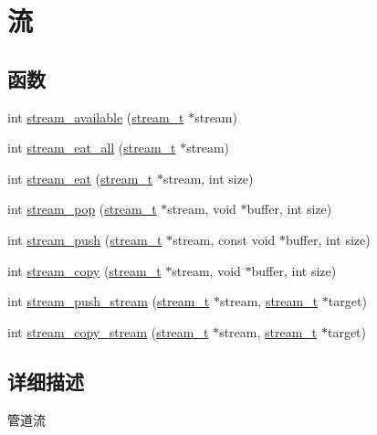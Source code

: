 \hypertarget{group__stream}{}\section{流}
\label{group__stream}
\subsection*{函数}
\begin{DoxyCompactItemize}
\item 
int \hyperlink{group__stream_ga6e109b2dc520782567dc1891af3b945e}{stream\+\_\+available} (\hyperlink{struct__stream__t}{stream\+\_\+t} $\ast$stream)
\item 
int \hyperlink{group__stream_gaef7f4ca2c201faf5d82a1dad4c8d7814}{stream\+\_\+eat\+\_\+all} (\hyperlink{struct__stream__t}{stream\+\_\+t} $\ast$stream)
\item 
int \hyperlink{group__stream_ga1ab922f8bab979099b3abc3ee54dc59d}{stream\+\_\+eat} (\hyperlink{struct__stream__t}{stream\+\_\+t} $\ast$stream, int size)
\item 
int \hyperlink{group__stream_ga6e01758abf49f8b08cd457f1cb48a954}{stream\+\_\+pop} (\hyperlink{struct__stream__t}{stream\+\_\+t} $\ast$stream, void $\ast$buffer, int size)
\item 
int \hyperlink{group__stream_gae7e63ef142733eb3aea7401e28bc9a75}{stream\+\_\+push} (\hyperlink{struct__stream__t}{stream\+\_\+t} $\ast$stream, const void $\ast$buffer, int size)
\item 
int \hyperlink{group__stream_ga380555bf71ee99f6b2bb4f76738d507f}{stream\+\_\+copy} (\hyperlink{struct__stream__t}{stream\+\_\+t} $\ast$stream, void $\ast$buffer, int size)
\item 
int \hyperlink{group__stream_gad5336c2b89b6edea5f277d5ebc221e15}{stream\+\_\+push\+\_\+stream} (\hyperlink{struct__stream__t}{stream\+\_\+t} $\ast$stream, \hyperlink{struct__stream__t}{stream\+\_\+t} $\ast$target)
\item 
int \hyperlink{group__stream_ga296aea89ba5bec6566e119855df3b18c}{stream\+\_\+copy\+\_\+stream} (\hyperlink{struct__stream__t}{stream\+\_\+t} $\ast$stream, \hyperlink{struct__stream__t}{stream\+\_\+t} $\ast$target)
\end{DoxyCompactItemize}


\subsection{详细描述}

\begin{DoxyPre}
管道流\end{DoxyPre}



